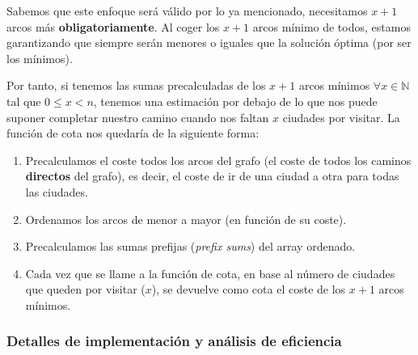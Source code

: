 \documentclass{article}
\begin{document}
Sabemos que este enfoque será válido por lo ya mencionado, necesitamos $x+1$ arcos más \textbf{obligatoriamente}. Al coger los $x+1$ arcos mínimo de todos, estamos garantizando que siempre serán menores o iguales que la solución óptima (por ser los mínimos).

Por tanto, si tenemos las sumas precalculadas de los $x+1$ arcos mínimos $\forall x \in \mathbb{N}$ tal que $0 \leq x < n$, tenemos una estimación por debajo de lo que nos puede suponer completar nuestro camino cuando nos faltan $x$ ciudades por visitar. La función de cota nos quedaría de la siguiente forma:

\begin{enumerate}
    \item Precalculamos el coste todos los arcos del grafo (el coste de todos los caminos \textbf{directos} del grafo), es decir, el coste de ir de una ciudad a otra para todas las ciudades.
    \item Ordenamos los arcos de menor a mayor (en función de su coste).
    \item Precalculamos las sumas prefijas (\textit{prefix sums}) del array ordenado.
    \item Cada vez que se llame a la función de cota, en base al número de ciudades que queden por visitar ($x$), 
    se devuelve como cota el coste de los $x+1$ arcos mínimos.
\end{enumerate} 

\subsubsection{Detalles de implementación y análisis de eficiencia}
\end{document}
